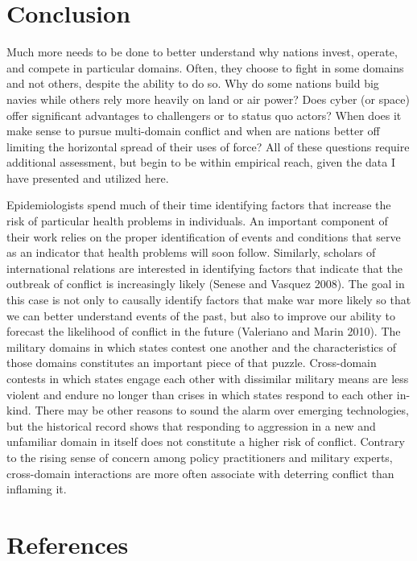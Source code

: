 \documentclass[
]{article}
\begin{document}
\hypertarget{conclusion}{%
\section{Conclusion}\label{conclusion}}

Much more needs to be done to better understand why nations invest, operate, and compete in particular domains. Often, they choose to fight in some domains and not others, despite the ability to do so. Why do some nations build big navies while others rely more heavily on land or air power? Does cyber (or space) offer significant advantages to challengers or to status quo actors? When does it make sense to pursue multi-domain conflict and when are nations better off limiting the horizontal spread of their uses of force? All of these questions require additional assessment, but begin to be within empirical reach, given the data I have presented and utilized here.

Epidemiologists spend much of their time identifying factors that increase the risk of particular health problems in individuals. An important component of their work relies on the proper identification of events and conditions that serve as an indicator that health problems will soon follow. Similarly, scholars of international relations are interested in identifying factors that indicate that the outbreak of conflict is increasingly likely (Senese and Vasquez 2008). The goal in this case is not only to causally identify factors that make war more likely so that we can better understand events of the past, but also to improve our ability to forecast the likelihood of conflict in the future (Valeriano and Marin 2010). The military domains in which states contest one another and the characteristics of those domains constitutes an important piece of that puzzle. Cross-domain contests in which states engage each other with dissimilar military means are less violent and endure no longer than crises in which states respond to each other in-kind. There may be other reasons to sound the alarm over emerging technologies, but the historical record shows that responding to aggression in a new and unfamiliar domain in itself does not constitute a higher risk of conflict. Contrary to the rising sense of concern among policy practitioners and military experts, cross-domain interactions are more often associate with deterring conflict than inflaming it.

\hypertarget{references}{%
\section*{References}\label{references}}
\end{document}
